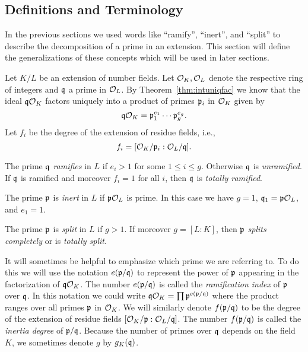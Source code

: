 \subsection{Definitions and Terminology}

In the previous sections we used words like ``ramify'',
``inert'', and ``split'' to describe the decomposition
of a prime in an extension. This section will define
the generalizations of these concepts which will be used
in later sections.

Let $K/L$ be an extension of number fields. Let
$\mathcal{O}_K,\mathcal{O}_L$ denote the respective ring of integers
and $\mathfrak{q}$ a prime in $\mathcal{O}_L$. By Theorem~\ref{thm:intuniqfac} we
know that the ideal $\mathfrak{q}\mathcal{O}_K$ factors uniquely into a product
of primes $\mathfrak{p}_i$ in $\mathcal{O}_K$ given by
$$
\mathfrak{q}\mathcal{O}_K = \mathfrak{p}_1^{e_1}\cdots\mathfrak{p}_g^{e_g}.
$$
Let $f_i$ be the degree of the extension of
residue fields, i.e.,
$$
f_i = [\mathcal{O}_K/\mathfrak{p}_i : \mathcal{O}_L/\mathfrak{q}].
$$

\begin{definition}\label{def:ramify}
	The prime $\mathfrak{q}$ \emph{ramifies} in $L$
	if $e_i>1$ for some $1\leq i\leq g$.
	Otherwise $\mathfrak{q}$ is \emph{unramified}.
	If $\mathfrak{q}$ is ramified and moreover $f_i=1$
	for all $i$, then $\mathfrak{q}$ is \emph{totally ramified}.
\end{definition}

\begin{definition}\label{def:inert}
	The prime $\mathfrak{p}$ is \emph{inert} in $L$
	if $\mathfrak{p}\mathcal{O}_L$ is prime. In this case we have $g=1$,
	$\mathfrak{q}_1=\mathfrak{p}\mathcal{O}_L$, and $e_1=1$.
\end{definition}

\begin{definition}\label{def:split}
	The prime $\mathfrak{p}$ is \emph{split} in $L$
	if $g>1$. If moreover $g = [L : K]$, then
	$\mathfrak{p}$ \emph{splits completely} or is
	\emph{totally split}.
\end{definition}

It will sometimes be helpful to emphasize which prime we are
referring to. To do this we will use the notation $e(\mathfrak{p}/\mathfrak{q})$
to represent the power of $\mathfrak{p}$ appearing in the
factorization of $\mathfrak{q}\mathcal{O}_K$. The number $e(\mathfrak{p}/\mathfrak{q})$ is called the
\emph{ramification index} of $\mathfrak{p}$ over $\mathfrak{q}$.
In this notation we could write $\mathfrak{q}\mathcal{O}_K = \prod \mathfrak{p}^{e(\mathfrak{p}/\mathfrak{q})}$
where the product ranges over all primes $\mathfrak{p}$ in $\mathcal{O}_K$.
We will similarly denote $f(\mathfrak{p}/\mathfrak{q})$ to be the degree of the extension
of residue fields $[\mathcal{O}_K/\mathfrak{p}:\mathcal{O}_L/\mathfrak{q}]$. The number $f(\mathfrak{p}/\mathfrak{q})$ is called
the \emph{inertia degree} of $\mathfrak{p}/\mathfrak{q}$. Because the number of primes
over $\mathfrak{q}$ depends on the field $K$, we sometimes denote $g$ by $g_K(\mathfrak{q})$.

